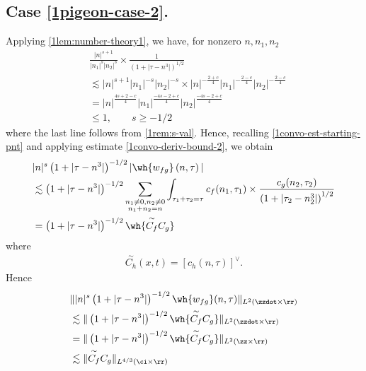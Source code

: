 \subsection{Case \eqref{1pigeon-case-2}.}
Applying \cref{1lem:number-theory1}, we have, for nonzero $ n, n_1, n_2 $
\begin{equation}
	\label{1convo-deriv-bound-2}
	\begin{split}
		& \frac{|n|^{s+1}}{|n_1|^s 
		| n_2|^s}
		\times
		\frac{1}{(1 + | \tau -n^3 |)^{1/2}}
		\\
		& \lesssim | n |^{s+1}| n_1 |^{-s}| n_2 |^{-s} \times | n
		|^{-\frac{2+c}{4}}| n_1 |^{-\frac{2-c}{4}}| n_2 |^{-\frac{2-c}{4}} 
		\\
		& = | n |^{\frac{4s +2 -c}{4}} | n_1 |^{\frac{-4s -2 +c}{4}} | n_2
		|^{\frac{-4s -2 +c}{4}}
		\\
		& \le 1, \qquad s \ge -1/2
	\end{split}  
\end{equation}
%
%
where the last line follows from \cref{1rem:s-val}.
%
%
Hence, recalling \eqref{1convo-est-starting-pnt} and applying estimate 
\eqref{1convo-deriv-bound-2}, we obtain
%
%
\begin{equation}
	\label{11f}
	\begin{split}
		& |n|^s  \left( 1 + | \tau - n^3 | \right)^{-1/2}| \wh{w_{fg}}\left( 
		n, \tau \right) |
		\\
		& \lesssim 
		\left( 1 + | \tau - n^3 | \right)^{-1/2}\sum_{\substack{n_1 \neq0, n_2 \neq 0 \\n_1 + n_2 =n}} \int_{\tau_1 + \tau_2 = \tau}		c_f(n_1, \tau_1)
		\times
		\frac{c_g(n_2, \tau_2)}{\left( 1 + | \tau_2 - n_2^3 | 
		\right)^{1/2}} 
		\\
		& = \left( 1 + | \tau - n^3 | \right)^{-1/2} \wh{\overset{\sim}{C_f} C_g}
	\end{split}
\end{equation}
%
where
%
%
\begin{equation*}
	\begin{split}
		\overset{\sim}{C_h}(x,t) = \left[ c_h(n, \tau) \right]^\vee.
	\end{split}
\end{equation*}
%
%
Hence
%
\begin{equation}
	\label{13f}
	\begin{split}
		& \| |n|^s \left( 1 + | \tau - n^3 | \right)^{-1/2} \wh{w_{fg}}(n, \tau) 
		\|_{L^2(\zzdot \times \rr)}
		\\
		& \lesssim \|\left( 1 + | \tau - n^3 | \right)^{-1/2} 
		\wh{\overset{\sim}{C_f} C_g } \|_{L^2(\zzdot \times \rr)}
		\\
		& =  \|\left( 1 + | \tau - n^3 | \right)^{-1/2} 
		\wh{\overset{\sim}{C_f} C_g } \|_{L^2(\zz \times \rr)}
		\\
		& \lesssim  \|\overset{\sim}{C_f} C_g  \|_{L^{4/3}(\ci \times \rr)}
	\end{split}
\end{equation}
